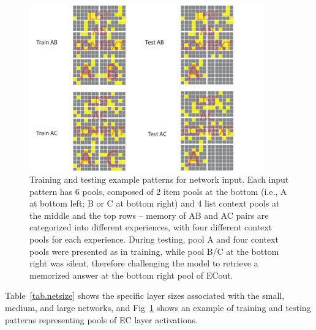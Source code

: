 \documentclass[11pt,twoside]{article}
\newif\myifpdf
\begin{document}
\begin{figure}
  \centering\includegraphics[width=4in]{fig_hip_edl_example_patterns}
  \caption{\footnotesize Training and testing example patterns for network input.  Each input pattern has 6 pools, composed of 2 item pools at the bottom (i.e., A at bottom left; B or C at bottom right) and 4 list context pools at the middle and the top rows -- memory of AB and AC pairs are categorized into different experiences, with four different context pools for each experience.  During testing, pool A and four context pools were presented as in training, while pool B/C at the bottom right was silent, therefore challenging the model to retrieve a memorized answer at the bottom right pool of ECout.}
\label{fig.example_pattern}
\end{figure}

Table~\ref{tab.netsize} shows the specific layer sizes associated with the small, medium, and large networks, and Fig~\ref{fig.example_pattern} shows an example of training and testing patterns representing pools of EC layer activations.

\end{document}

